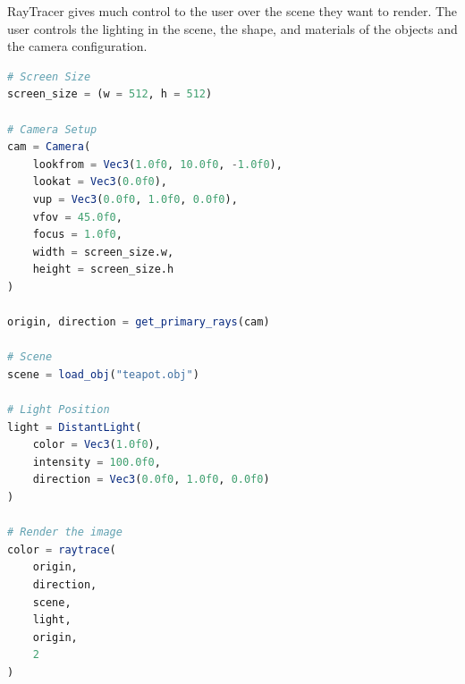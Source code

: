 \documentclass{juliacon}
\begin{document}
RayTracer gives much control to the user over the scene they want to render. The user controls the lighting in the scene, the shape, and materials of the objects and the camera configuration.

\noindent
\begin{minipage}{\linewidth}
\begin{lstlisting}[caption = {Rendering the Utah Teapot Model},
                   label = {lst:example_render},
                   captionpos = b,
                   language = Julia]
# Screen Size
screen_size = (w = 512, h = 512)
    
# Camera Setup
cam = Camera(
    lookfrom = Vec3(1.0f0, 10.0f0, -1.0f0),
    lookat = Vec3(0.0f0),
    vup = Vec3(0.0f0, 1.0f0, 0.0f0),
    vfov = 45.0f0,
    focus = 1.0f0,
    width = screen_size.w,
    height = screen_size.h
)
                 
origin, direction = get_primary_rays(cam)
    
# Scene
scene = load_obj("teapot.obj")
    
# Light Position
light = DistantLight(
    color = Vec3(1.0f0),
    intensity = 100.0f0,
    direction = Vec3(0.0f0, 1.0f0, 0.0f0)
)
                         
# Render the image
color = raytrace(
    origin,
    direction,
    scene,
    light,
    origin,
    2
)
\end{lstlisting}
\end{minipage}
\end{document}
